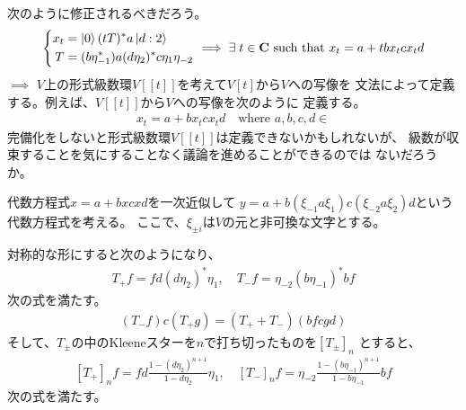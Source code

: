 {\begin{description}
		次のように修正されるべきだろう。
		\begin{equation*}\begin{split}
			\left\{\begin{split}
				x_t &= \mathinner{|{0}\rangle}(tT)^*a\mathinner{|{d:2}\rangle} \\
				T &= (b\eta_{-1}^*)a(d\eta_2)^*c\eta_1\eta_{-2} \\
			\end{split}\right. \implies \exists\; t\in\mathbf{C} \text{ such that }
			x_t = a + tbx_tcx_td
		\end{split}\end{equation*}
		$\implies$ $V$上の形式級数環$V[[t]]$を考えて$V[t]$から$V$への写像を
		文法によって定義する。例えば、$V[[t]]$から$V$への写像を次のように
		定義する。
		\begin{equation*}\begin{split}
			x_t = a + bx_tcx_td \quad\text{where }a,b,c,d\in 
		\end{split}\end{equation*}
		完備化をしないと形式級数環$V[[t]]$は定義できないかもしれないが、
		級数が収束することを気にすることなく議論を進めることができるのでは
		ないだろうか。
		\item[サブセット構成法] 代数方程式$x=a+bxcxd$を一次近似して
		$y=a+b(\xi_{-1}a\xi_1)c(\xi_{-2}a\xi_2)d$という代数方程式を考える。
		ここで、$\xi_{\pm i}$は$V$の元と非可換な文字とする。
		\item[変形] 対称的な形にすると次のようになり、
		\begin{equation*}\begin{split}
			T_+f = fd(d\eta_2)^*\eta_1,\quad 
			T_-f = \eta_{-2}(b\eta_{-1})^*bf
		\end{split}\end{equation*}
		次の式を満たす。
		\begin{equation*}\begin{split}
			(T_-f)c(T_+g) = (T_+ + T_-)(bfcgd)
		\end{split}\end{equation*}
		そして、$T_\pm$の中のKleeneスターを$n$で打ち切ったものを$[T_\pm]_n$
		とすると、
		\begin{equation*}\begin{split}
			[T_+]_nf = fd\frac{1 - (d\eta_2)^{n+1}}{1 - d\eta_2}\eta_1,\quad 
			[T_-]_nf = \eta_{-2}\frac{1 - (b\eta_{-1})^{n+1}}{1 - b\eta_{-1}}bf
		\end{split}\end{equation*}
		次の式を満たす。
		\begin{equation*}\begin{split}

\end{split}
\end{equation*}
\end{description}}
